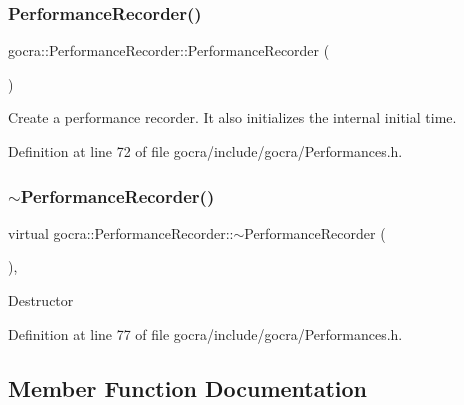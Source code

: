 \subsubsection{\texorpdfstring{Performance\+Recorder()}{PerformanceRecorder()}}
{\footnotesize\ttfamily gocra\+::\+Performance\+Recorder\+::\+Performance\+Recorder (\begin{DoxyParamCaption}{ }\end{DoxyParamCaption})\hspace{0.3cm}{\ttfamily [inline]}}

Create a performance recorder. It also initializes the internal initial time. 

Definition at line 72 of file gocra/include/gocra/\+Performances.\+h.

\hypertarget{classgocra_1_1PerformanceRecorder_afc202dd11f2fc8fdacec3022e01946c2}{}\label{classgocra_1_1PerformanceRecorder_afc202dd11f2fc8fdacec3022e01946c2} 
\subsubsection{\texorpdfstring{$\sim$\+Performance\+Recorder()}{~PerformanceRecorder()}}
{\footnotesize\ttfamily virtual gocra\+::\+Performance\+Recorder\+::$\sim$\+Performance\+Recorder (\begin{DoxyParamCaption}{ }\end{DoxyParamCaption})\hspace{0.3cm}{\ttfamily [inline]}, {\ttfamily [virtual]}}

Destructor 

Definition at line 77 of file gocra/include/gocra/\+Performances.\+h.



\subsection{Member Function Documentation}
\hypertarget{classgocra_1_1PerformanceRecorder_a96c4be3089ddcddeb69c2335108da0bf}{}\label{classgocra_1_1PerformanceRecorder_a96c4be3089ddcddeb69c2335108da0bf} 
